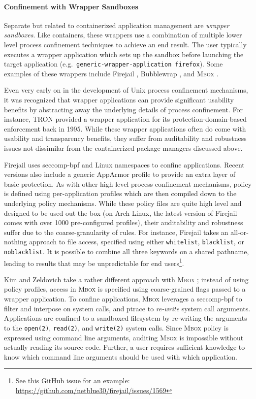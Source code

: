 \documentclass[dvipsnames, 12pt]{article}
\newcommand{\kimmbox}{\textsc{Mbox}}
\begin{document}
\paragraph*{Confinement with Wrapper Sandboxes}

Separate but related to containerized application management are \textit{wrapper
sandboxes}. Like containers, these wrappers use a combination of multiple lower
level process confinement techniques to achieve an end result.  The user
typically executes a wrapper application which sets up the sandbox before
launching the target application (e.g.~\texttt{generic-wrapper-application
firefox}).  Some examples of these wrappers include Firejail \cite{firejail},
Bubblewrap \cite{bubblewrap}, and \kimmbox{} \cite{kim2013_mbox}.

Even very early on in the development of Unix process confinement mechanisms, it
was recognized that wrapper applications can provide significant usability
benefits by abstracting away the underlying details of process confinement.  For
instance, TRON \cite{berman1995_tron} provided a wrapper application for its
protection-domain-based enforcement back in 1995. While these wrapper
applications often do come with usability and transparency benefits, they suffer
from auditability and robustness issues not dissimilar from the containerized
package managers discussed above.

Firejail \cite{firejail} uses seccomp-bpf and Linux namespaces to confine
applications. Recent versions also include a generic AppArmor profile to provide
an extra layer of basic protection. As with other high level process confinement
mechanisms, policy is defined using per-application profiles which are then
compiled down to the underlying policy mechanisms. While these policy files are
quite high level and designed to be used out the box (on Arch Linux, the latest
version of Firejail comes with over 1000 pre-configured profiles), their
auditability and robustness suffer due to the coarse-granularity of rules. For
instance, Firejail takes an all-or-nothing approach to file access, specified
using either \texttt{whitelist}, \texttt{blacklist}, or \texttt{noblacklist}. It
is possible to combine all three keywords on a shared pathname, leading to
results that may be unpredictable for end users\footnote{See this GitHub issue
for an example: \url{https://github.com/netblue30/firejail/issues/1569}}.

Kim and Zeldovich take a rather different approach with \kimmbox{}
\cite{kim2013_mbox}; instead of using policy profiles, access in \kimmbox{} is
specified using coarse-grained flags passed to a wrapper application. To confine
applications, \kimmbox{} leverages a seccomp-bpf to filter and interpose on
system calls, and ptrace to \textit{re-write} system call arguments.
Applications are confined to a sandboxed filesystem by re-writing the arguments
to the \texttt{open(2)}, \texttt{read(2)}, and \texttt{write(2)} system calls.
Since \kimmbox{} policy is expressed using command line arguments, auditing
\kimmbox{} is impossible without actually reading its source code. Further,
a user requires sufficient knowledge to know which command line arguments should
be used with which application.
\end{document}
